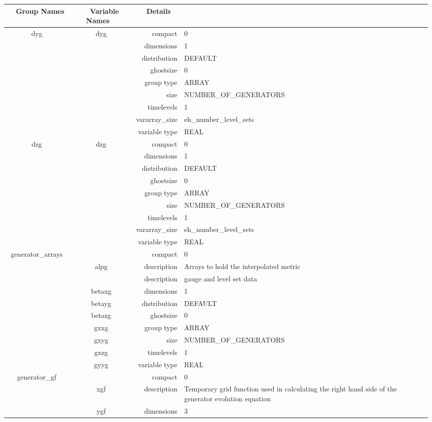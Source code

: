 \begin{tabular*}{150mm}{|c|c@{\extracolsep{\fill}}|rl|} \hline 
~ {\bf Group Names} ~ & ~ {\bf Variable Names} ~  &{\bf Details} ~ & ~ \\ 
\hline 
dyg & dyg & compact & 0 \\ 
 &  & dimensions & 1 \\ 
 &  & distribution & DEFAULT \\ 
 &  & ghostsize & 0 \\ 
 &  & group type & ARRAY \\ 
 &  & size & NUMBER\_OF\_GENERATORS \\ 
 &  & timelevels & 1 \\ 
 &  & vararray\_size & eh\_number\_level\_sets \\ 
 &  & variable type & REAL \\ 
\hline 
dzg & dzg & compact & 0 \\ 
 &  & dimensions & 1 \\ 
 &  & distribution & DEFAULT \\ 
 &  & ghostsize & 0 \\ 
 &  & group type & ARRAY \\ 
 &  & size & NUMBER\_OF\_GENERATORS \\ 
 &  & timelevels & 1 \\ 
 &  & vararray\_size & eh\_number\_level\_sets \\ 
 &  & variable type & REAL \\ 
\hline 
generator\_arrays &  & compact & 0 \\ 
 & alpg & description & Arrays to hold the interpolated metric \\ 
& ~ & description &  gauge and level set data \\ 
 & betaxg & dimensions & 1 \\ 
 & betayg & distribution & DEFAULT \\ 
 & betazg & ghostsize & 0 \\ 
 & gxxg & group type & ARRAY \\ 
 & gxyg & size & NUMBER\_OF\_GENERATORS \\ 
 & gxzg & timelevels & 1 \\ 
 & gyyg & variable type & REAL \\ 
\hline 
generator\_gf &  & compact & 0 \\ 
 & xgf & description & Temporary grid function used in calculating the right hand side of the generator evolution equation \\ 
 & ygf & dimensions & 3 \\ 

\end{tabular*}
